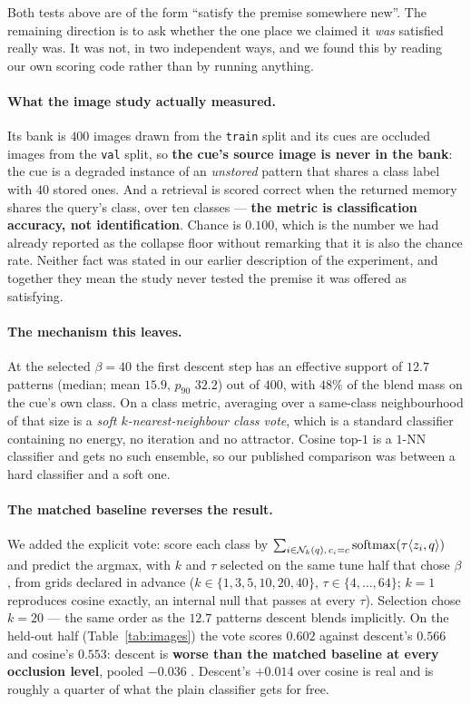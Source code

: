 Both tests above are of the form ``satisfy the premise somewhere new''. The remaining
direction is to ask whether the one place we claimed it \emph{was} satisfied really was. It
was not, in two independent ways, and we found this by reading our own scoring code rather
than by running anything.

\paragraph{What the image study actually measured.} Its bank is $400$ images drawn from the
\texttt{train} split and its cues are occluded images from the \texttt{val} split, so
\textbf{the cue's source image is never in the bank}: the cue is a degraded instance of an
\emph{unstored} pattern that shares a class label with $40$ stored ones. And a retrieval is
scored correct when the returned memory shares the query's class, over ten classes ---
\textbf{the metric is classification accuracy, not identification}. Chance is $0.100$, which
is the number we had already reported as the collapse floor without remarking that it is
also the chance rate. Neither fact was stated in our earlier description of the experiment,
and together they mean the study never tested the premise it was offered as satisfying.

\paragraph{The mechanism this leaves.} At the selected $\beta{=}40$ the first descent step
has an effective support of $12.7$ patterns (median; mean $15.9$, $p_{90}$ $32.2$) out of
$400$, with $48\%$ of the blend mass on the cue's own class. On a class metric, averaging
over a same-class neighbourhood of that size is a \emph{soft $k$-nearest-neighbour class
vote}, which is a standard classifier containing no energy, no iteration and no attractor.
Cosine top-$1$ is a $1$-NN classifier and gets no such ensemble, so our published comparison
was between a hard classifier and a soft one.

\paragraph{The matched baseline reverses the result.} We added the explicit vote: score each
class by $\sum_{i \in \mathcal{N}_k(q),\, c_i = c} \operatorname{softmax}(\tau\langle z_i,q\rangle)$ and
predict the argmax, with $k$ and $\tau$ selected on the same tune half that chose $\beta$,
from grids declared in advance ($k \in \{1,3,5,10,20,40\}$, $\tau \in \{4,\dots,64\}$;
$k{=}1$ reproduces cosine exactly, an internal null that passes at every $\tau$). Selection
chose $k{=}20$ --- the same order as the $12.7$ patterns descent blends implicitly. On the
held-out half (Table~\ref{tab:images}) the vote scores $0.602$ against descent's $0.566$ and
cosine's $0.553$: descent is \textbf{worse than the matched baseline at every occlusion
level}, pooled $-0.036$ . Descent's $+0.014$ over cosine is real and is
roughly a quarter of what the plain classifier gets for free.

